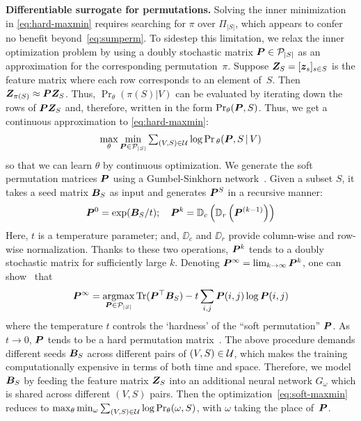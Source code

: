 \documentclass{article}
\newcommand{\xhdr}[1]{\noindent\textbf{#1.}}
\DeclareMathOperator*{\argmax}{argmax}
\renewcommand{\cite}{\citep}
\begin{document}
\xhdr{Differentiable surrogate for permutations}
Solving the inner minimization in \eqref{eq:hard-maxmin} requires searching for $\pi$ over $\Pi_{|S|}$, which appears to confer no benefit beyond~\eqref{eq:sumperm}. To sidestep this limitation, we relax the inner optimization problem by using a doubly stochastic matrix $\bm{P} \in \mathcal{P}_{|S|}$ as an approximation for the corresponding permutation~$\pi$.
Suppose $\bm{Z}_S = [\bm{z}_s]_{s\in S}$ is the feature matrix where each row corresponds to an element of~$S$.  Then $\bm{Z}_{\pi(S)} \approx \bm{P} \bm{Z}_S$. 
Thus, $\Pr_\theta(\pi(S)|V)$ can be evaluated by iterating down the rows of $\bm{P}\bm{Z}_S$ and, therefore, written in the form $\mathop{\mathrm{Pr}}_\theta(\bm{P}, S)$.    Thus, we get a continuous approximation to \eqref{eq:hard-maxmin}:
\begin{align}
\max_{\theta} \min_{\bm{P} \in \mathcal{P}_{|S|} }
\textstyle\sum_{(V,S)\in \mathcal{U}} \log \mathop{\mathrm{Pr}}{}_\theta (\bm{P}, S \,|\, V) \label{eq:soft-maxmin}  
\end{align}
so that we can learn $\theta$ by continuous optimization.
We generate the soft permutation matrices $\bm{P}$ using a Gumbel-Sinkhorn network~\cite{mena2018learning}. Given a subset $S$, it takes a seed matrix $\bm{B}_S$ as input and generates $\bm{P}^S$ in a recursive manner:
\begin{align}
 \bm{P}^{0} = \exp(\bm{B}_S/t); \quad
 \bm{P}^{k} = \mathbb{D}_c \left(\mathbb{D}_r\left(\bm{P}^{(k-1)} \right)\right) \label{eq:sinkh}
\end{align}
Here, $t$ is a temperature parameter; and, $\DD_c$ and $\DD_r$ provide column-wise and row-wise normalization. Thanks to these two operations, $\bm{P}^k$ tends to a doubly stochastic matrix for sufficiently large $k$.  Denoting $\bm{P}^\infty = \lim_{k\to\infty} \bm{P}^k$, one can show~\cite{mena2018learning} that
\begin{align*}
 \Pb^\infty = \argmax_{\Pb \in \mathcal{P}_{|S|}}
 \text{Tr} (\Pb^\top \Bb_S) - t \sum_{i,j} \Pb(i,j) \log \Pb(i,j)  
\end{align*}
where the temperature $t$ controls the `hardness' of the ``soft permutation'' $\bm{P}$.
As $t\to 0$, $\bm{P}$ tends to be a hard permutation matrix~\cite{cuturi2013sinkhorn}. 
%
The above procedure demands different seeds $\bm{B}_{S}$ across different pairs of $(V, S)\in \mathcal{U}$, which makes the training  computationally expensive in terms of both time and space. Therefore, we model $\bm{B}_{S}$ by feeding the feature matrix $\bm{Z}_S$ into an additional neural network $G_{\omega}$ which is shared across different $(V,S)$ pairs. Then the optimization~\eqref{eq:soft-maxmin} reduces to $\max_{\theta} \min_{\omega}\sum_{(V,S)\in \mathcal{U}}\log \mathop{\mathrm{Pr}}_\theta (\omega, S)$, with $\omega$ taking the place of~$\bm{P}$.
\end{document}
